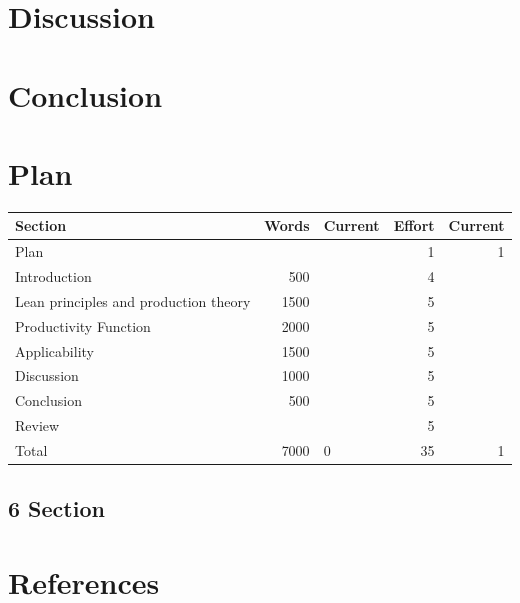 \documentclass{article}
\begin{document}
\section{Discussion}
\label{sec:orgf3b6b8b}
\section{Conclusion}
\label{sec:org7df6744}

\section{Plan}
\label{sec:orgc0e0ab1}
\begin{center}
\begin{tabular}{lrlrr}
Section & Words & Current & Effort & Current\\
\hline
Plan &  &  & 1 & 1\\
Introduction & 500 &  & 4 & \\
Lean principles and production theory & 1500 &  & 5 & \\
Productivity Function & 2000 &  & 5 & \\
Applicability & 1500 &  & 5 & \\
Discussion & 1000 &  & 5 & \\
Conclusion & 500 &  & 5 & \\
Review &  &  & 5 & \\
\hline
Total & 7000 & 0 & 35 & 1\\
\end{tabular}
\end{center}
\subsection{6 Section}
\label{sec:orga43f411}

\section{References}
\label{sec:orgde87518}

\printbibliography[title=none]
\end{document}
